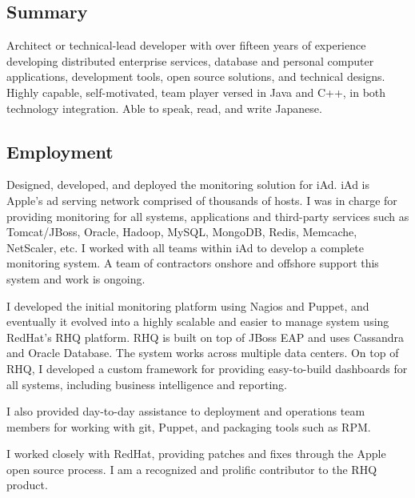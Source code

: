 \documentclass{article}
\begin{document}
\address{
1025 NE 73RD Street - Seattle WA 98115 - USA - 425-466-8702 \\
http://www.noderunner.net/\%7Egenman/ - genman@noderunner.net }

\setlength{\parindent}{0pt}
\setlength{\leftskip}{0pt}
\setlength{\parskip}{8pt}

\subsection*{Summary}
Architect or technical-lead developer with over fifteen years of experience
developing distributed enterprise services, database and personal computer
applications, development tools, open source solutions, and technical designs.
Highly capable, self-motivated, team player versed in Java and C++, in both
technology integration. Able to speak, read, and write Japanese. 

\subsection*{Employment}

  

Designed, developed, and deployed the monitoring solution for iAd. iAd
is Apple's ad serving network comprised of thousands of hosts. I was
in charge for providing monitoring for all systems, applications and
third-party services such as Tomcat/JBoss, Oracle, Hadoop, MySQL, MongoDB,
Redis, Memcache, NetScaler, etc. I worked with all teams within iAd to
develop a complete monitoring system. A team of contractors onshore and
offshore support this system and work is ongoing.

I developed the initial monitoring platform using Nagios and Puppet,
and eventually it evolved into a highly scalable and easier to manage
system using RedHat's RHQ platform. RHQ is built on top of JBoss EAP
and uses Cassandra and Oracle Database. The system works across multiple
data centers. On top of RHQ, I developed a custom framework for providing
easy-to-build dashboards for all systems, including business intelligence
and reporting.

I also provided day-to-day assistance to deployment and operations team
members for working with git, Puppet, and packaging tools such as RPM.

I worked closely with RedHat, providing patches and fixes through the
Apple open source process. I am a recognized and prolific contributor
to the RHQ product.
\end{document}
